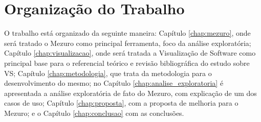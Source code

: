 \section{Organização do Trabalho}

O trabalho está organizado da seguinte maneira: Capítulo \ref{chap:mezuro}, onde
será tratado o Mezuro como principal ferramenta, foco da análise exploratória;
Capítulo \ref{chap:visualizacao}, onde será tratada a Visualização de Software
como principal base para o referencial teórico e revisão bibliográfica do estudo
sobre VS; Capítulo \ref{chap:metodologia}, que trata da metodologia para o
desenvolvimento do mesmo; no Capítulo \ref{chap:analise_exploratoria} é
apresentada a análise exploratória de fato do Mezuro, com explicação de um dos
casos de uso; Capítulo \ref{chap:proposta}, com a proposta de melhoria para o
Mezuro; e o Capítulo \ref{chap:conclusao} com as conclusões.
